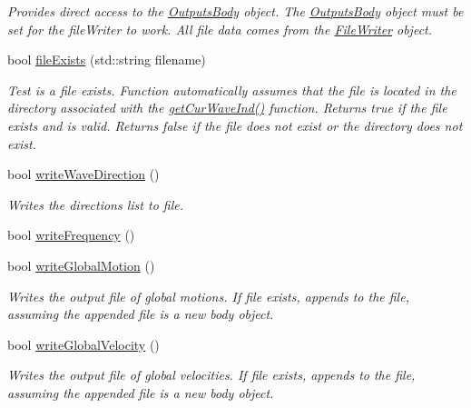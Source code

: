 \begin{DoxyCompactItemize}
\begin{DoxyCompactList}\small\item\em Provides direct access to the \hyperlink{classosea_1_1ofreq_1_1_outputs_body}{Outputs\-Body} object. The \hyperlink{classosea_1_1ofreq_1_1_outputs_body}{Outputs\-Body} object must be set for the file\-Writer to work. All file data comes from the \hyperlink{classosea_1_1ofreq_1_1_file_writer}{File\-Writer} object. \end{DoxyCompactList}\item 
bool \hyperlink{classosea_1_1ofreq_1_1_file_writer_afc22f7afcd30f676e5385133247ed84d}{file\-Exists} (std\-::string filename)
\begin{DoxyCompactList}\small\item\em Test is a file exists. Function automatically assumes that the file is located in the directory associated with the \hyperlink{classosea_1_1ofreq_1_1_file_writer_a9748d987475a225b49e14f48b8be0cd6}{get\-Cur\-Wave\-Ind()} function. Returns true if the file exists and is valid. Returns false if the file does not exist or the directory does not exist. \end{DoxyCompactList}\item 
bool \hyperlink{classosea_1_1ofreq_1_1_file_writer_a0428a4f8ad72d01ff5316bfa3e4ce631}{write\-Wave\-Direction} ()
\begin{DoxyCompactList}\small\item\em Writes the directions list to file. \end{DoxyCompactList}\item 
bool \hyperlink{classosea_1_1ofreq_1_1_file_writer_ac6df31af71020a41adb6ecd6ff136532}{write\-Frequency} ()
\item 
bool \hyperlink{classosea_1_1ofreq_1_1_file_writer_a5c921b5ae92039cf50458e2c46e204da}{write\-Global\-Motion} ()
\begin{DoxyCompactList}\small\item\em Writes the output file of global motions. If file exists, appends to the file, assuming the appended file is a new body object. \end{DoxyCompactList}\item 
bool \hyperlink{classosea_1_1ofreq_1_1_file_writer_a2078a50dbd21946aeed86d8e0bccd50e}{write\-Global\-Velocity} ()
\begin{DoxyCompactList}\small\item\em Writes the output file of global velocities. If file exists, appends to the file, assuming the appended file is a new body object. \end{DoxyCompactList}\item 

\end{DoxyCompactItemize}
